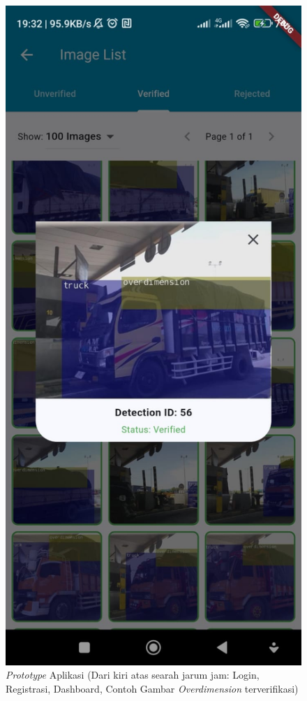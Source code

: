 \begin{figure}[htbp]
  \includegraphics[scale=0.2]{gambar/bab3-contoh-verified.jpeg}


  \caption{\centering \emph{Prototype} Aplikasi (Dari kiri atas searah jarum jam: Login, Registrasi, Dashboard, Contoh Gambar \emph{Overdimension} terverifikasi)}
  \label{fig:prototype}
\end{figure}

